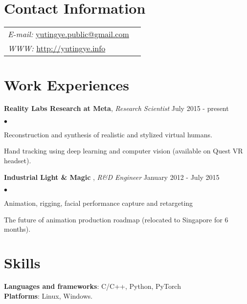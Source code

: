 \documentclass[margin,line]{res}
\newenvironment{list2}{
  \begin{list}{$\bullet$}{%
      \setlength{\itemsep}{0in}
      \setlength{\parsep}{0in} \setlength{\parskip}{0in}
      \setlength{\topsep}{0in} \setlength{\partopsep}{0in} 
      \setlength{\leftmargin}{0.2in}}}{\end{list}}
\begin{document}

\begin{resume}
\section{\sc Contact Information}
\vspace{.05in}
\begin{tabular}{@{}p{3in}p{3in}}
{\it E-mail:}    \href{mailto:yutingye.public@gmail.com}{yutingye.public@gmail.com} \\
{\it WWW:}  \href{http://yutingye.info}{http://yutingye.info} \\ 
\end{tabular}

\section{\sc Work Experiences}
{\bf Reality Labs Research at Meta}, {\em Research Scientist}  \hfill July 2015 - present \\
\begin{list2}
\vspace*{-.15in}
\item Reconstruction and synthesis of realistic and stylized virtual humans.
\item Hand tracking using deep learning and computer vision (available on Quest VR headset).
\end{list2}

{\bf Industrial Light \& Magic} , {\em R\&D Engineer} \hfill January 2012 - July 2015 \\
\begin{list2}
\vspace*{-.15in}
\item Animation, rigging,  facial performance capture and retargeting
\item The future of animation production roadmap (relocated to Singapore for 6 months).
\end{list2}

\section{\sc Skills}
{\bf Languages and frameworks}: C/C++, Python, PyTorch\\
{\bf Platforms}: Linux, Windows. 



\end{resume}
\end{document}
